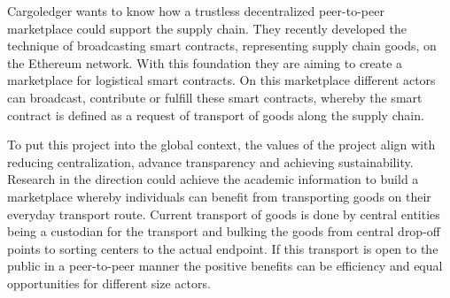 \documentclass[11pt]{article}
\begin{document}
Cargoledger wants to know how a trustless decentralized peer-to-peer marketplace could support the supply chain. They recently developed the technique of broadcasting smart contracts, representing supply chain goods, on the Ethereum network\cite{buterin2014next}. With this foundation they are aiming to create a marketplace for logistical smart contracts. On this marketplace different actors can broadcast, contribute or fulfill these smart contracts, whereby the smart contract is defined as a request of transport of goods along the supply chain. \par
To put this project into the global context, the values of the project align with reducing centralization, advance transparency and achieving sustainability. Research in the direction could achieve the academic information to build a marketplace whereby individuals can benefit from transporting goods on their everyday transport route. Current transport of goods is done by central entities being a custodian for the transport and bulking the goods from central drop-off points to sorting centers to the actual endpoint. If this transport is open to the public in a peer-to-peer manner the positive benefits can be efficiency and equal opportunities for different size actors.\par
\end{document}
